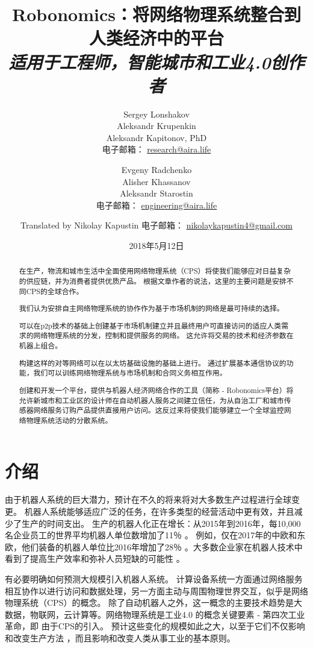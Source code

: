 \documentclass[UTF8]{article}
\title{Robonomics：将网络物理系统整合到人类经济中的平台 \\ \small
\textit{适用于工程师，智能城市和工业4.0创作者}}
\date{2018年5月12日}
\author{Sergey Lonshakov \\ Aleksandr Krupenkin \\ Aleksandr Kapitonov, PhD \\ 电子邮箱： \href{mailto:research@aira.life}{research@aira.life} \and Evgeny Radchenko \\ Alisher Khassanov \\ Aleksandr Starostin \\ 电子邮箱： \href{mailto:engineering@aira.life}{engineering@aira.life} \and Translated by Nikolay Kapustin 电子邮箱： \href{mailto:nikolaykapustin4@gmail.com}{nikolaykapustin4@gmail.com} }
\begin{document}
\maketitle
 
\begin{abstract}
在生产，物流和城市生活中全面使用网络物理系统（CPS）将使我们能够应对日益复杂的供应链，并为消费者提供优质产品。 根据文章作者的说法，这里的主要问题是安排不同CPS的全球合作。

我们认为安排自主网络物理系统的协作作为基于市场机制的网络是最可持续的选择。

可以在p2p技术的基础上创建基于市场机制建立并且最终用户可直接访问的适应人类需求的网络物理系统的分发，控制和提供服务的网络。 这允许将交易的技术和经济参数在机器上组合。

构建这样的对等网络可以在以太坊基础设施的基础上进行。 通过扩展基本通信协议的功能，我们可以训练网络物理系统与市场机制和合同义务相互作用。

创建和开发一个平台，提供与机器人经济网络合作的工具（简称 -  Robonomics平台）将允许新城市和工业区的设计师在自动机器人服务之间建立信任，为从自治工厂和城市传感器网络服务订购产品提供直接用户访问。这反过来将使我们能够建立一个全球监控网络物理系统活动的分散系统。
\end{abstract}

\tableofcontents

\section{介绍}
由于机器人系统的巨大潜力，预计在不久的将来\cite{Pedersen2016RobotDeployment}将对大多数生产过程进行全球变更。 机器人系统能够适应\cite{Stock2016Opportunities4.0}广泛的任务，在许多类型的经营活动中更有效，并且减少了生产的时间支出。 生产的机器人化正在增长：从2015年到2016年，每10,000名企业员工的世界平均机器人单位数增加了11％ \cite{2018RobotRobotics.}。 例如，仅在2017年的中欧和东欧，他们装备的机器人单位比2016年增加了28％ \cite{2018EnterFactories} 。大多数企业家在机器人技术中看到了提高生产效率和弥补人员短缺的可能性 \cite{2018EnterFactories} 。

有必要明确如何预测大规模引入机器人系统。 计算设备系统一方面通过网络服务相互协作以进行访问和数据处理，另一方面主动与周围物理世界交互，似乎是网络物理系统（CPS）的概念\cite{Kang2016SmartDirections}。 除了自动机器人之外，这一概念的主要技术趋势是大数据，物联网，云计算等。网络物理系统是工业4.0 \cite{Jazdi2014Cyber4.0}的概念关键要素 - 第四次工业革命，即 由于CPS的引入。 预计这些变化的规模如此之大，以至于它们不仅影响和改变生产方法\cite{MonostoriLaszlo2014Cyber-physicalChallenges} ，而且影响和改变人类从事工业的基本原则。
\end{document}
